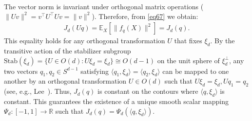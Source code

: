 \documentclass[11pt,a4paper]{article}
\theoremstyle{definition}
\begin{document}
The vector norm is invariant under orthogonal matrix operations ($\|U v\|^2 = v^\top U^\top U v = \|v\|^2$). Therefore, from \eqref{eq67} we obtain:
\begin{align}
J_d(Uq) = \mathbb{E}_{X}\left[ \|f_q(X)\|^2 \right] = J_d(q).
\end{align}
This equality holds for any orthogonal transformation $U$ that fixes $\xi_d$. By the transitive action of the stabilizer subgroup
$
\mathrm{Stab}(\xi_d)
=
\{U\in O(d):U\xi_d=\xi_d\}
\cong O(d-1)
$
on the unit sphere of $\xi_d^\perp$, any two vectors
$q_1,q_2\in S^{d-1}$ satisfying
$
\langle q_1,\xi_d\rangle
=
\langle q_2,\xi_d\rangle
$
can be mapped to one another by an orthogonal transformation $U\in O(d)$ such that
$
U\xi_d=\xi_d,
Uq_1=q_2
$
(see, e.g., Lee~\cite{lee2013smooth}). Thus, $J_d(q)$ is constant on the contours where $\langle q, \xi_d \rangle$ is constant. This guarantees the existence of a unique smooth scalar mapping $\Psi_d: [-1,1] \rightarrow \mathbb{R}$ such that $J_d(q) = \Psi_d(\langle q, \xi_d \rangle)$.
\end{document}
